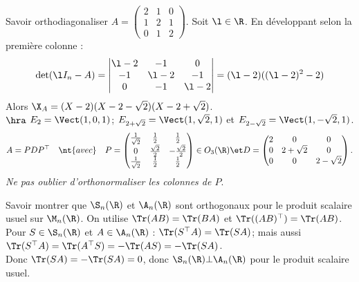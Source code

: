\documentclass[french, 11pt]{article}
\begin{document}
\begin{question}{}{}
    Savoir orthodiagonaliser $A=\begin{pmatrix}2&1&0\\1&2&1\\0&1&2\end{pmatrix}$.
    \tcblower
    Soit $\l\in\R$. En développant selon la première colonne :
    \begin{equation*}
        \det(\l I_n - A) = \begin{vmatrix}\l - 2 & -1 & 0 \\ -1 & \l-2 & -1 \\ 0 & -1 & \l - 2\end{vmatrix} = (\l-2)((\l-2)^2 - 2)
    \end{equation*}
    Alors $\X_A = (X-2)(X-2-\sqrt{2})(X-2+\sqrt{2})$.\\
    $\hra$ $E_2=\Vect(1,0,1)$; $E_{2+\sqrt{2}}=\Vect(1,\sqrt{2},1)$ et $E_{2-\sqrt{2}}=\Vect(1,-\sqrt{2},1)$.
    \begin{equation*}
        A = PDP^\top \quad\nt{avec}\quad P=\begin{pmatrix}\frac{1}{\sqrt{2}} & \frac{1}{2} & \frac{1}{2} \\ 0 & \frac{\sqrt{2}}{2} & -\frac{\sqrt{2}}{2} \\ \frac{1}{\sqrt{2}} & \frac{1}{2} & \frac{1}{2}\end{pmatrix} \in O_3(\R) \et D=\begin{pmatrix}2&0&0\\0&2+\sqrt{2}&0\\0&0&2-\sqrt{2}\end{pmatrix}.
    \end{equation*}
    \emph{Ne pas oublier d'orthonormaliser les colonnes de $P$}.
\end{question}

\vspace*{-1cm}

\begin{question}{}{}
    Savoir montrer que $\S_n(\R)$ et $\A_n(\R)$ sont orthogonaux pour le produit scalaire usuel sur $\M_n(\R)$.
    \tcblower
    On utilise $\Tr(AB)=\Tr(BA)$ et $\Tr((AB)^\top) = \Tr(AB)$.\\
    Pour $S\in\S_n(\R)$ et $A\in\A_n(\R)$ : $\Tr(S^\top A) = \Tr(SA)$; mais aussi $\Tr(S^\top A) = \Tr(A^\top S) = -\Tr(AS)=-\Tr(SA)$.\\
    Donc $\Tr(SA)=-\Tr(SA)=0$, donc $\S_n(\R)\bot\A_n(\R)$ pour le produit scalaire usuel.
\end{question}
\end{document}
